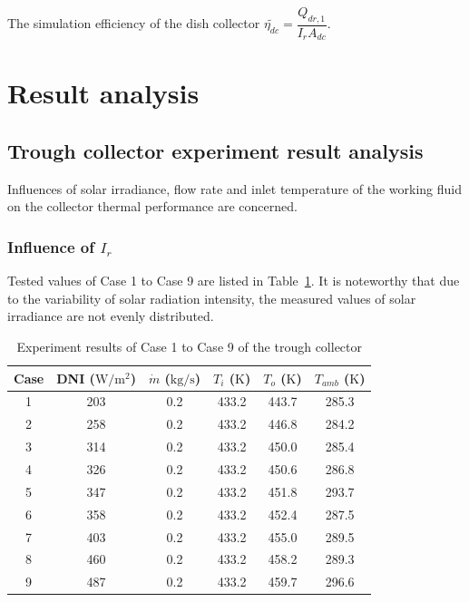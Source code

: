 The simulation efficiency of the dish collector $\widetilde{\eta_{dc}} = \dfrac{Q_{dr,1}}{I_r A_{dc}}$.

\section{Result analysis}
\subsection{Trough collector experiment result analysis}
Influences of solar irradiance, flow rate and inlet temperature of the working fluid on the collector thermal performance are concerned.
\subsubsection{Influence of $I_r$}
Tested values of Case 1 to Case 9 are listed in Table~\ref{tab:ResultOfTrough1}. It is noteworthy that due to the variability of solar radiation intensity, the measured values of solar irradiance are not evenly distributed.

\begin{table}[htbp]\footnotesize
	\caption{Experiment results of Case 1 to Case 9 of the trough collector}
	\begin{center}
	\begin{tabular}{cccccc}
		\toprule
		Case	& DNI ($\mathrm{W/m^2}$)	&	$\dot{m}$ ($\mathrm{kg/s}$)			&	$T_i$ ($\mathrm{K}$)	&	$T_o$ ($\mathrm{K}$)		&	$T_{amb}$ ($\mathrm{K}$)\\
		\midrule
		1	&	203	&	0.2	&	433.2	&	443.7	&	285.3\\
		2	&	258	&	0.2	&	433.2	&	446.8	&	284.2\\
		3	&	314	&	0.2	&	433.2	&	450.0	&	285.4	\\
		4	&	326	&	0.2	&	433.2	&	450.6	&	286.8\\
		5	&	347	&	0.2	&	433.2	&	451.8	&	293.7\\
		6	&	358	&	0.2	&	433.2	&	452.4	&	287.5\\
		7	&	403	&	0.2	&	433.2	&	455.0	&	289.5\\
		8	&	460	&	0.2	&	433.2	&	458.2	&	289.3\\
		9	&	487	&	0.2	&	433.2	&	459.7	&	296.6\\
		\bottomrule
	\end{tabular}
	\end{center}
	\label{tab:ResultOfTrough1}
\end{table}

